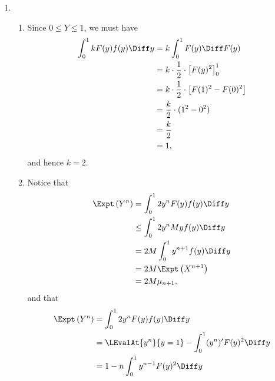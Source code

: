 \begin{enumerate}
    \item \begin{enumerate}
              \item Since \(0 \leq Y \leq 1\), we must have
                    \begin{align*}
                        \int_{0}^{1} k F(y) f(y) \Diff y & = k \int_{0}^{1} F(y) \Diff F(y)                         \\
                                                         & = k \cdot \frac{1}{2} \cdot \left[F(y)^2\right]_{0}^{1}  \\
                                                         & = k \cdot \frac{1}{2} \cdot \left[F(1)^2 - F(0)^2\right] \\
                                                         & = \frac{k}{2} \cdot (1^2 - 0^2)                          \\
                                                         & = \frac{k}{2}                                            \\
                                                         & = 1,
                    \end{align*}
                    and hence \(k = 2\).
              \item Notice that
                    \begin{align*}
                        \Expt\left(Y^n\right) & = \int_{0}^{1} 2y^n F(y) f(y) \Diff y    \\
                                              & \leq \int_{0}^{1} 2y^n My f(y) \Diff y   \\
                                              & = 2M \int_{0}^{1} y^{n + 1} f(y) \Diff y \\
                                              & = 2M \Expt\left(X^{n + 1}\right)         \\
                                              & = 2M \mu_{n + 1},
                    \end{align*}
                    and that
                    \begin{align*}
                        \Expt\left(Y^n\right) & = \int_{0}^{1} 2y^n F(y) f(y) \Diff y                                                                                 \\
                                              & = \LEvalAt{y^n}{y = 1} - \int_{0}^{1} (y^n)' F(y)^2 \Diff y                                                           \\
                                              & = 1 - n \int_{0}^{1} y^{n - 1} F(y)^2 \Diff y                                                                         \\

\end{align*}
\end{enumerate}
\end{enumerate}
